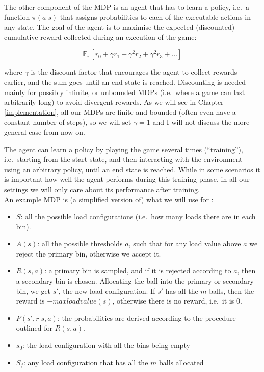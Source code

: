 The other component of the MDP is an agent that has to learn a policy, i.e.\ a function $\pi(a|s)$ that assigns probabilities to each of the executable actions in any state. The goal of the agent is to maximise the expected (discounted) cumulative reward collected during an execution of the game:

\begin{equation}\label{eq:cumReward}
\mathbb{E}_{\pi}[r_{0} + \gamma r_{1} + \gamma^2 r_{2} + \gamma^2 r_{3} + ...]
\end{equation}

where $\gamma$ is the discount factor that encourages the agent to collect rewards earlier, and the sum goes until an end state is reached. Discounting is needed mainly for possibly infinite, or unbounded MDPs (i.e.\ where a game can last arbitrarily long) to avoid divergent rewards. As we will see in Chapter \ref{implementation}, all our MDPs are finite and bounded (often even have a constant number of steps), so we will set $\gamma=1$ and I will not discuss the more general case from now on. 


The agent can learn a policy by playing the game several times (``training''), i.e.\ starting from the start state, and then interacting with the environment using an arbitrary policy, until an end state is reached. While in some scenarios it is important how well the agent performs during this training phase, in all our settings we will only care about its performance after training.\\

An example MDP is (a simplified version of) what we will use for \TwoThinning:

\begin{itemize}
    \item 
    $S$: all the possible load configurations (i.e.\ how many loads there are in each bin).
    \item
    $A(s)$: all the possible thresholds $a$, such that for any load value above $a$ we reject the primary bin, otherwise we accept it.
    \item
    $R(s, a)$: a primary bin is sampled, and if it is rejected according to $a$, then a secondary bin is chosen. Allocating the ball into the primary or secondary bin, we get $s'$, the new load configuration. If $s'$ has all the $m$ balls, then the reward is $-maxloadvalue(s)$, otherwise there is no reward, i.e.\ it is $0$.
    \item
    $P(s', r | s, a)$: the probabilities are derived according to the procedure outlined for $R(s,a)$.
    \item
    $s_0$: the load configuration with all the bins being empty
    \item
    $S_f$: any load configuration that has all the $m$ balls allocated
\end{itemize}


